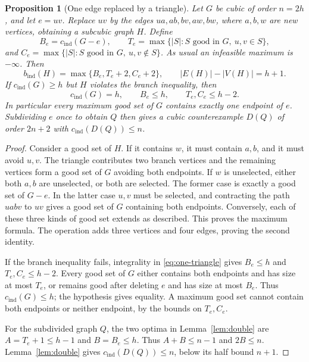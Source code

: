 \documentclass[11pt]{article}
\newtheorem{proposition}[theorem]{Proposition}
\newcommand{\cind}{c_{\mathrm{ind}}}
\newcommand{\bind}{b_{\mathrm{ind}}}
\begin{document}
\begin{proposition}[One edge replaced by a triangle]\label{prop:one-triangle}
Let $G$ be cubic of order $n=2h$, and let $e=uv$. Replace $uv$ by
the edges $ua,ab,bv,aw,bw$, where $a,b,w$ are new vertices, obtaining
a subcubic graph $H$. Define
\[
 B_e=\cind(G-e),\qquad
 T_e=\max\{|S|:S\text{ good in }G,\ u,v\in S\},
\]
and $C_e=\max\{|S|:S\text{ good in }G,\ u,v\notin S\}$.
As usual an infeasible maximum is $-\infty$. Then
\begin{equation}\label{eq:one-triangle}
 \bind(H)=\max\{B_e,T_e+2,C_e+2\},\qquad
 |E(H)|-|V(H)|=h+1.
\end{equation}
If $\cind(G)\geq h$ but $H$ violates the branch inequality, then
\[
 \cind(G)=h,\qquad B_e\leq h,\qquad T_e,C_e\leq h-2.
\]
In particular every maximum good set of $G$ contains exactly one
endpoint of $e$. Subdividing $e$ once to obtain $Q$ then gives a
cubic counterexample $D(Q)$ of order $2n+2$ with
$\cind(D(Q))\leq n$.
\end{proposition}
\begin{proof}
Consider a good set of $H$. If it contains $w$, it must contain
$a,b$, and it must avoid $u,v$. The triangle contributes two branch
vertices and the remaining vertices form a good set of $G$ avoiding
both endpoints. If $w$ is unselected, either both $a,b$ are
unselected, or both are selected. The former case is exactly a good
set of $G-e$. In the latter case $u,v$ must be selected, and
contracting the path $uabv$ to $uv$ gives a good set of $G$ containing
both endpoints. Conversely, each of these three kinds of good set
extends as described. This proves the maximum formula. The operation
adds three vertices and four edges, proving the second identity.

If the branch inequality fails, integrality in
\eqref{eq:one-triangle} gives $B_e\leq h$ and $T_e,C_e\leq h-2$.
Every good set of $G$ either contains both endpoints and has size at
most $T_e$, or remains good after deleting $e$ and has size at most
$B_e$. Thus $\cind(G)\leq h$; the hypothesis gives equality.
A maximum good set cannot contain both endpoints or neither endpoint,
by the bounds on $T_e,C_e$.

For the subdivided graph $Q$, the two optima in
Lemma~\ref{lem:double} are $A=T_e+1\leq h-1$ and $B=B_e\leq h$.
Thus $A+B\leq n-1$ and $2B\leq n$. Lemma~\ref{lem:double} gives
$\cind(D(Q))\leq n$, below its half bound $n+1$.
\end{proof}
\end{document}
